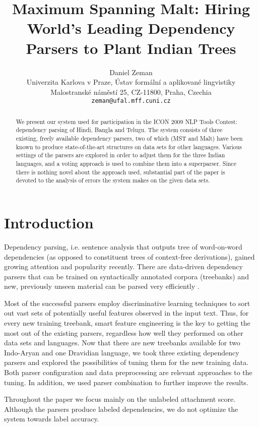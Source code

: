 \documentclass[11pt]{article}
\title{Maximum Spanning Malt: Hiring World's Leading Dependency Parsers to Plant Indian Trees%
}
\author{Daniel Zeman\\
Univerzita Karlova v Praze, Ústav formální a aplikované lingvistiky\\
Malostranské náměstí 25, CZ-11800, Praha, Czechia\\ 
\texttt{zeman@ufal.mff.cuni.cz}
}
\date{}
\begin{document}
\maketitle
\thispagestyle{fancy}

\begin{abstract}
We present our system used for participation in the ICON 2009 NLP Tools Contest: dependency parsing of Hindi, Bangla and Telugu. The system consists of three existing, freely available dependency parsers, two of which (MST and Malt) have been known to produce state-of-the-art structures on data sets for other languages. Various settings of the parsers are explored in order to adjust them for the three Indian languages, and a voting approach is used to combine them into a superparser. Since there is nothing novel about the approach used, substantial part of the paper is devoted to the analysis of errors the system makes on the given data sets.
\end{abstract}

\section{Introduction}
\label{sec:intro}

Dependency parsing, i.e. sentence analysis that outputs tree of word-on-word dependencies (as opposed to constituent trees of context-free derivations), gained growing attention and popularity recently. There are data-driven dependency parsers that can be trained on syntactically annotated corpora (treebanks) and new, previously unseen material can be parsed very efficiently \citep{nivre:2009:ACLIJCNLP}.

Most of the successful parsers employ discriminative learning techniques to sort out vast sets of potentially useful features observed in the input text. Thus, for every new training treebank, smart feature engineering is the key to getting the most out of the existing parsers, regardless how well they performed on other data sets and languages. Now that there are new treebanks available for two Indo-Aryan and one Dravidian language, we took three existing dependency parsers and explored the possibilities of tuning them for the new training data. Both parser configuration and data preprocessing are relevant approaches to the tuning. In addition, we used parser combination to further improve the results.

Throughout the paper we focus mainly on the unlabeled attachment score. Although the parsers produce labeled dependencies, we do not optimize the system towards label accuracy.
\end{document}
